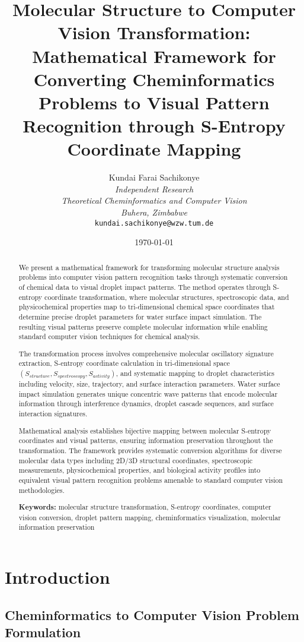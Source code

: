 \documentclass[12pt,a4paper]{article}
\title{\textbf{Molecular Structure to Computer Vision Transformation: \\ Mathematical Framework for Converting Cheminformatics Problems to Visual Pattern Recognition through S-Entropy Coordinate Mapping}}
\author{
Kundai Farai Sachikonye\\
\textit{Independent Research}\\
\textit{Theoretical Cheminformatics and Computer Vision}\\
\textit{Buhera, Zimbabwe}\\
\texttt{kundai.sachikonye@wzw.tum.de}
}
\date{\today}
\begin{document}
\maketitle

\begin{abstract}
We present a mathematical framework for transforming molecular structure analysis problems into computer vision pattern recognition tasks through systematic conversion of chemical data to visual droplet impact patterns. The method operates through S-entropy coordinate transformation, where molecular structures, spectroscopic data, and physicochemical properties map to tri-dimensional chemical space coordinates that determine precise droplet parameters for water surface impact simulation. The resulting visual patterns preserve complete molecular information while enabling standard computer vision techniques for chemical analysis.

The transformation process involves comprehensive molecular oscillatory signature extraction, S-entropy coordinate calculation in tri-dimensional space $(S_{structure}, S_{spectroscopy}, S_{activity})$, and systematic mapping to droplet characteristics including velocity, size, trajectory, and surface interaction parameters. Water surface impact simulation generates unique concentric wave patterns that encode molecular information through interference dynamics, droplet cascade sequences, and surface interaction signatures.

Mathematical analysis establishes bijective mapping between molecular S-entropy coordinates and visual patterns, ensuring information preservation throughout the transformation. The framework provides systematic conversion algorithms for diverse molecular data types including 2D/3D structural coordinates, spectroscopic measurements, physicochemical properties, and biological activity profiles into equivalent visual pattern recognition problems amenable to standard computer vision methodologies.

\textbf{Keywords:} molecular structure transformation, S-entropy coordinates, computer vision conversion, droplet pattern mapping, cheminformatics visualization, molecular information preservation
\end{abstract}

\section{Introduction}

\subsection{Cheminformatics to Computer Vision Problem Formulation}
\end{document}
